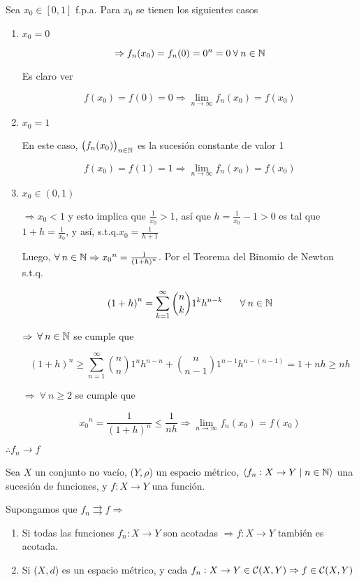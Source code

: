 \begin{proofexplanation}
    Sea $x_0 \in [0,1]$ f.p.a. Para $x_0$ se tienen los siguientes casos

    \begin{enumerate}
        \item $x_0 = 0$

        $$\Rightarrow f_n(x_0) = f_n(0) = 0^n = 0 \: \forall \: n \in \mathbb{N}$$

        Es claro ver

        $$f(x_0) = f(0) = 0 \Rightarrow \lim_{n \to \infty} f_n(x_0) = f(x_0)$$

        \item $x_0 = 1$

        En este caso,  ${\left(f_n(x_0)\right)}_{n \in \mathbb{N}}$ es la sucesión constante de valor 1

        $$f(x_0) = f(1) = 1 \Rightarrow \lim_{n \to \infty} f_n(x_0) = f(x_0)$$
        \item $x_0 \in (0,1)$

        $\Rightarrow x_0 < 1$ y esto implica que $\frac{1}{x_0} > 1$, así que $h = \frac{1}{x_0} -1 > 0$ es tal que $1 + h = \frac{1}{x_0}$, y así, s.t.q.$x_0 = \frac{1}{h+1}$

        Luego, $\forall \: n \in \mathbb{N} \Rightarrow {x_0}^{n} = \frac{1}{{(1+h)}^{n}}$. Por el Teorema del Binomio de Newton s.t.q.

        $${(1+h)}^{n} = \sum_{k=1}^{\infty}  \binom{n}{k} {1}^{k} {h}^{n-k} \: \: \: \: \: \: \: \: \forall \: n \in \mathbb{N}$$

        $\Rightarrow \: \forall \: n \in \mathbb{N}$ se cumple que 

        $${(1+h)}^{n} \geqslant  \sum_{n=1}^{\infty}  \binom{n}{n} {1}^{n} {h}^{n-n} +  \binom{n}{n-1} {1}^{n-1} {h}^{n-(n-1)} = 1 + nh \geqslant nh$$

        $\Rightarrow \: \forall \: n \geqslant 2$ se cumple que

        $${x_0}^{n} = \frac{1}{{(1+h)}^{n}} \leqslant \frac{1}{nh} \Rightarrow  \lim_{n \to \infty} f_n(x_0) = f(x_0)$$
    \end{enumerate}

    $\therefore f_n \to f$
\end{proofexplanation}

\begin{lemma} \label{lemma513}
    Sea $X$ un conjunto no vacío, ($Y , \rho$) un espacio métrico, $\langle f_n : X \to Y \mid n \in \mathbb{N} \rangle$ una sucesión de funciones, y $f : X \to Y$ una función. 
    
    Supongamos que $f_n \rightrightarrows f \Rightarrow$

    \begin{enumerate}
        \item Si todas las funciones $f_n : X \to Y$ son acotadas $\Rightarrow f : X \to Y$ también es acotada.
        \item Si ($X,d$) es un espacio métrico, y cada $f_n : X \to Y \in \mathcal{C}(X,Y) \Rightarrow f \in \mathcal{C}(X,Y)$
    \end{enumerate}
\end{lemma}

